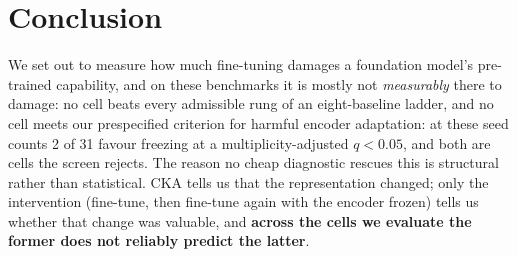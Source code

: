 \section{Conclusion}
\label{sec:conclusion}

We set out to measure how much fine-tuning damages a foundation model's
pre-trained capability, and on these benchmarks it is mostly not
\emph{measurably} there to damage: no cell beats every admissible rung of an
eight-baseline ladder, and no cell meets our
prespecified criterion for harmful encoder adaptation: at these seed counts 2 of 31 favour
freezing at a multiplicity-adjusted $q{<}0.05$, and both are cells the screen
rejects.
The reason no cheap diagnostic rescues this is structural rather than statistical.
CKA tells us that the representation changed; only the intervention (fine-tune,
then fine-tune again with the encoder frozen) tells us whether that change was
valuable, and \textbf{across the cells we evaluate the former does not reliably
predict the latter}.
